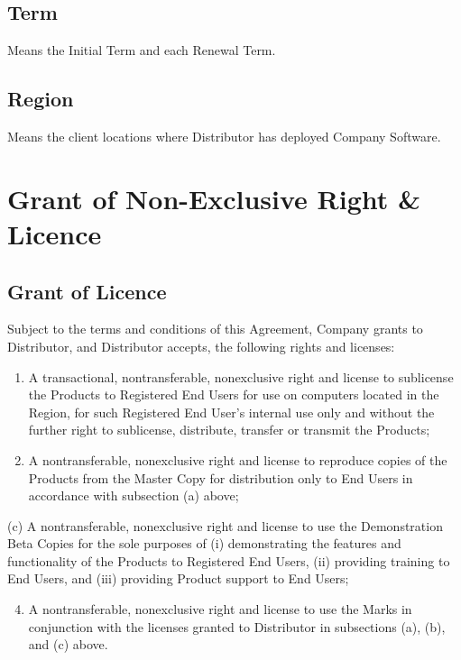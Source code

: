 \documentclass[letterpaper,10pt,english]{sphinxmanual}
\begin{document}
\section{Term}
\label{\detokenize{definitions:term}}
Means the Initial Term and each Renewal Term.


\section{Region}
\label{\detokenize{definitions:region}}
Means the client locations where Distributor has deployed Company Software.


\chapter{Grant of Non-Exclusive Right \& Licence}
\label{\detokenize{grantlicence:grant-of-non-exclusive-right-licence}}\label{\detokenize{grantlicence::doc}}

\section{Grant of Licence}
\label{\detokenize{grantlicence:grant-of-licence}}
Subject to the terms and conditions of this Agreement, Company grants to Distributor, and Distributor accepts, the following rights and licenses:
\begin{enumerate}
\item {} 
A transactional, nontransferable, nonexclusive right and license to sublicense the Products to Registered End Users for use on computers located in the Region, for such Registered End User’s internal use only and without the further right to sublicense, distribute, transfer or transmit the Products;

\item {} 
A nontransferable, nonexclusive right and license to reproduce copies of the Products from the Master Copy for distribution only to End Users in accordance with subsection (a) above;

\end{enumerate}

(c)     A nontransferable, nonexclusive right and license to use the Demonstration Beta
Copies for the sole purposes of (i) demonstrating the features and functionality of the Products to Registered End Users, (ii) providing training to End Users, and (iii) providing Product support to
End Users;
\begin{enumerate}
\setcounter{enumi}{3}
\item {} 
A nontransferable, nonexclusive right and license to use the Marks in conjunction with the licenses granted to Distributor in subsections (a), (b), and (c) above.

\end{enumerate}
\end{document}
